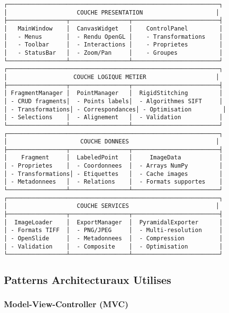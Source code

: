 \documentclass[12pt,a4paper]{article}
\begin{document}
\begin{verbatim}
┌─────────────────────────────────────────────────────────────┐
│                    COUCHE PRESENTATION                     │
├─────────────────┬─────────────────┬─────────────────────────┤
│   MainWindow    │  CanvasWidget   │    ControlPanel         │
│   - Menus       │  - Rendu OpenGL │    - Transformations    │
│   - Toolbar     │  - Interactions │    - Proprietes         │
│   - StatusBar   │  - Zoom/Pan     │    - Groupes            │
└─────────────────┴─────────────────┴─────────────────────────┘
┌─────────────────────────────────────────────────────────────┐
│                   COUCHE LOGIQUE METIER                    │
├─────────────────┬─────────────────┬─────────────────────────┤
│ FragmentManager │  PointManager   │  RigidStitching         │
│ - CRUD fragments│  - Points labels│  - Algorithmes SIFT     │
│ - Transformations│ - Correspondances│ - Optimisation         │
│ - Selections    │  - Alignement   │  - Validation           │
└─────────────────┴─────────────────┴─────────────────────────┘
┌─────────────────────────────────────────────────────────────┐
│                     COUCHE DONNEES                         │
├─────────────────┬─────────────────┬─────────────────────────┤
│    Fragment     │  LabeledPoint   │     ImageData           │
│ - Proprietes    │  - Coordonnees  │  - Arrays NumPy         │
│ - Transformations│ - Etiquettes   │  - Cache images         │
│ - Metadonnees   │  - Relations    │  - Formats supportes    │
└─────────────────┴─────────────────┴─────────────────────────┘
┌─────────────────────────────────────────────────────────────┐
│                    COUCHE SERVICES                         │
├─────────────────┬─────────────────┬─────────────────────────┤
│  ImageLoader    │  ExportManager  │  PyramidalExporter      │
│ - Formats TIFF  │  - PNG/JPEG     │  - Multi-resolution     │
│ - OpenSlide     │  - Metadonnees  │  - Compression          │
│ - Validation    │  - Composite    │  - Optimisation         │
└─────────────────┴─────────────────┴─────────────────────────┘
\end{verbatim}

\subsection{Patterns Architecturaux Utilises}

\subsubsection{Model-View-Controller (MVC)}
\end{document}
